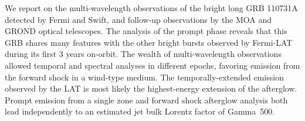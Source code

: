 


\bigskip



\bigskip

\noindent We report on the multi-wavelength observations of the bright long GRB 110731A detected by Fermi and Swift, and follow-up observations by the MOA and GROND optical telescopes. The analysis of the prompt phase reveals that this GRB shares many features with the other bright bursts observed by Fermi-LAT during its first 3 years on-orbit. The wealth of multi-wavelength observations allowed
temporal and spectral analyses in different epochs, favoring emission from the forward shock in a wind-type medium. The temporally-extended emission observed by the LAT is most likely the highest-energy extension of the afterglow. Prompt emission from a single zone and forward shock afterglow analysis both lead independently to an estimated jet bulk Lorentz factor of Gamma~500.
